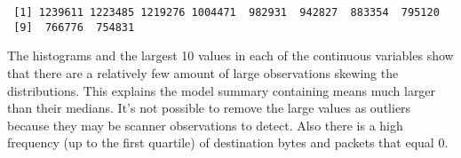 \documentclass[12pt,twoside]{dukestatscithesis}
\theoremstyle{definition}
\theoremstyle{definition}
\theoremstyle{definition}
\theoremstyle{remark}
\begin{document}
\begin{Shaded}
\begin{Highlighting}[]
\NormalTok{)}
\end{Highlighting}
\end{Shaded}
\begin{verbatim}
 [1] 1239611 1223485 1219276 1004471  982931  942827  883354  795120
 [9]  766776  754831
\end{verbatim}
The histograms and the largest 10 values in each of the continuous
variables show that there are a relatively few amount of large
observations skewing the distributions. This explains the model summary
containing means much larger than their medians. It's not possible to
remove the large values as outliers because they may be scanner
observations to detect. Also there is a high frequency (up to the first
quartile) of destination bytes and packets that equal 0.
\end{document}
